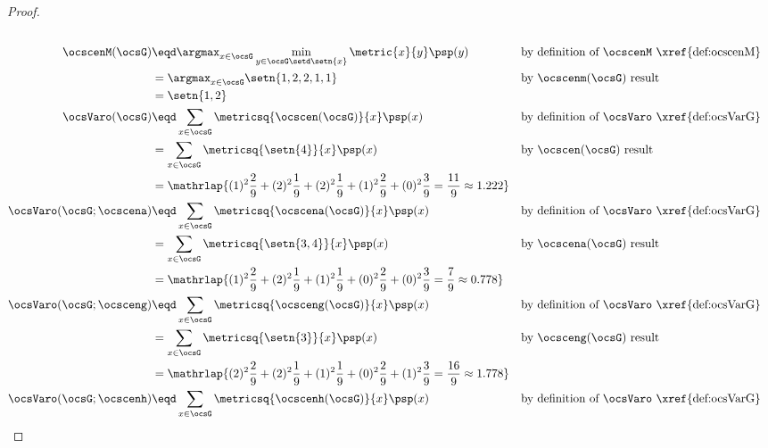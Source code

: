 \begin{tabstr}{0.75}
\begin{proof}
\begin{align*}
{{\begin{array}{c}
             \end{array}}}
      \\
      \ocscenM(\ocsG)
        &\eqd \argmax_{x\in\ocsG}\min_{y\in\ocsG\setd\setn{x}}\metric{x}{y}\psp(y)
        &&\text{by definition of $\ocscenM$ \xref{def:ocscenM}}
      \\&= \argmax_{x\in\ocsG}\setn{1,2,2,1,1}
        && \text{by $\ocscenm(\ocsG)$ result}
      \\&= \setn{1,2}
      \\
      \ocsVaro(\ocsG)
        &\eqd \sum_{x\in\ocsG}\metricsq{\ocscen(\ocsG)}{x}\psp(x)
        && \text{by definition of $\ocsVaro$ \xref{def:ocsVarG}}
      \\&= \sum_{x\in\ocsG}\metricsq{\setn{4}}{x}\psp(x)
        && \text{by $\ocscen(\ocsG)$ result}
      \\&= \mathrlap{
           (1)^2\frac{2}{9}+  %
           (2)^2\frac{1}{9}+  %
           (2)^2\frac{1}{9}+  %
           (1)^2\frac{2}{9}+  %
           (0)^2\frac{3}{9}   %
         = \frac{11}{9}  \approx 1.222}
      \\
      \ocsVaro(\ocsG;\ocscena)
        &\eqd \sum_{x\in\ocsG}\metricsq{\ocscena(\ocsG)}{x}\psp(x)
        && \text{by definition of $\ocsVaro$ \xref{def:ocsVarG}}
      \\&= \sum_{x\in\ocsG}\metricsq{\setn{3,4}}{x}\psp(x)
        && \text{by $\ocscena(\ocsG)$ result}
      \\&= \mathrlap{
           (1)^2\frac{2}{9}+  %
           (2)^2\frac{1}{9}+  %
           (1)^2\frac{1}{9}+  %
           (0)^2\frac{2}{9}+  %
           (0)^2\frac{3}{9}   %
         = \frac{7}{9}  \approx 0.778}
      \\
      \ocsVaro(\ocsG;\ocsceng)
        &\eqd \sum_{x\in\ocsG}\metricsq{\ocsceng(\ocsG)}{x}\psp(x)
        && \text{by definition of $\ocsVaro$ \xref{def:ocsVarG}}
      \\&= \sum_{x\in\ocsG}\metricsq{\setn{3}}{x}\psp(x)
        && \text{by $\ocsceng(\ocsG)$ result}
      \\&= \mathrlap{
           (2)^2\frac{2}{9}+  %
           (2)^2\frac{1}{9}+  %
           (1)^2\frac{1}{9}+  %
           (0)^2\frac{2}{9}+  %
           (1)^2\frac{3}{9}   %
         = \frac{16}{9}  \approx 1.778}
      \\
      \ocsVaro(\ocsG;\ocscenh)
        &\eqd \sum_{x\in\ocsG}\metricsq{\ocscenh(\ocsG)}{x}\psp(x)
        && \text{by definition of $\ocsVaro$ \xref{def:ocsVarG}}

\end{align*}
\end{proof}
\end{tabstr}
